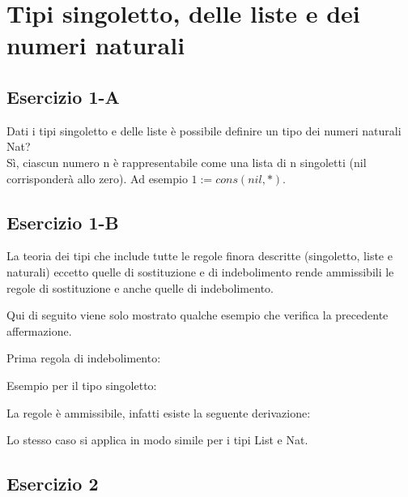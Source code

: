 \newpage
\section{Tipi singoletto, delle liste e dei numeri naturali}

\subsection{Esercizio 1-A}

Dati i tipi singoletto e delle liste è possibile definire un tipo dei numeri 
naturali Nat? \\

Sì, ciascun numero n è rappresentabile come una lista di n singoletti (nil
corrisponderà allo zero). Ad esempio $1 := cons(nil, *)$.

\subsection{Esercizio 1-B}

La teoria dei tipi che include tutte le regole finora descritte (singoletto,
liste e naturali) eccetto quelle di sostituzione e di indebolimento rende
ammissibili le regole di sostituzione e anche quelle di indebolimento.

Qui di seguito viene solo mostrato qualche esempio che verifica la precedente
affermazione.

Prima regola di indebolimento:

\begin{prooftree}
\end{prooftree}

Esempio per il tipo singoletto:

\begin{prooftree}
\end{prooftree}

La regole è ammissibile, infatti esiste la seguente derivazione:

\begin{prooftree}
\end{prooftree}

Lo stesso caso si applica in modo simile per i tipi List e Nat.

\subsection{Esercizio 2}

